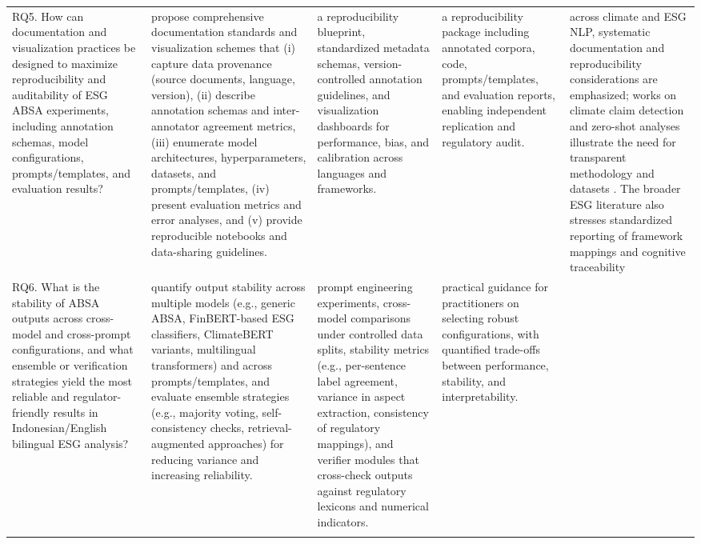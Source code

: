 \begin{landscape}
\begin{longtable}{p{6cm} p{6cm} p{4cm} p{3cm} p{6cm}}
\addlinespace
RQ5. How can documentation and visualization practices be designed to maximize reproducibility and auditability of ESG ABSA experiments, including annotation schemas, model configurations, prompts/templates, and evaluation results? & propose comprehensive documentation standards and visualization schemes that (i) capture data provenance (source documents, language, version), (ii) describe annotation schemas and inter-annotator agreement metrics, (iii) enumerate model architectures, hyperparameters, datasets, and prompts/templates, (iv) present evaluation metrics and error analyses, and (v) provide reproducible notebooks and data-sharing guidelines. & a reproducibility blueprint, standardized metadata schemas, version-controlled annotation guidelines, and visualization dashboards for performance, bias, and calibration across languages and frameworks. & a reproducibility package including annotated corpora, code, prompts/templates, and evaluation reports, enabling independent replication and regulatory audit. & across climate and ESG NLP, systematic documentation and reproducibility considerations are emphasized; works on climate claim detection and zero-shot analyses illustrate the need for transparent methodology and datasets \cite{10.2139/ssrn.3796152,10.1371/journal.pone.0288052,10.1051/e3sconf/202343602004}. The broader ESG literature also stresses standardized reporting of framework mappings and cognitive traceability \cite{10.1108/medar-11-2020-1097,10.1108/aaaj-06-2021-5330,10.1108/aaaj-02-2020-4445} \\
\addlinespace
RQ6. What is the stability of ABSA outputs across cross-model and cross-prompt configurations, and what ensemble or verification strategies yield the most reliable and regulator-friendly results in Indonesian/English bilingual ESG analysis? & quantify output stability across multiple models (e.g., generic ABSA, FinBERT-based ESG classifiers, ClimateBERT variants, multilingual transformers) and across prompts/templates, and evaluate ensemble strategies (e.g., majority voting, self-consistency checks, retrieval-augmented approaches) for reducing variance and increasing reliability. & prompt engineering experiments, cross-model comparisons under controlled data splits, stability metrics (e.g., per-sentence label agreement, variance in aspect extraction, consistency of regulatory mappings), and verifier modules that cross-check outputs against regulatory lexicons and numerical indicators. & practical guidance for practitioners on selecting robust configurations, with quantified trade-offs between performance, stability, and interpretability. &  \\
\addlinespace


\end{longtable}

\end{landscape}